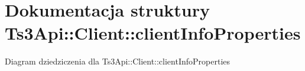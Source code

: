 \hypertarget{struct_ts3_api_1_1_client_1_1client_info_properties}{}\section{Dokumentacja struktury Ts3\+Api\+:\+:Client\+:\+:client\+Info\+Properties}
\label{struct_ts3_api_1_1_client_1_1client_info_properties}


Diagram dziedziczenia dla Ts3\+Api\+:\+:Client\+:\+:client\+Info\+Properties
